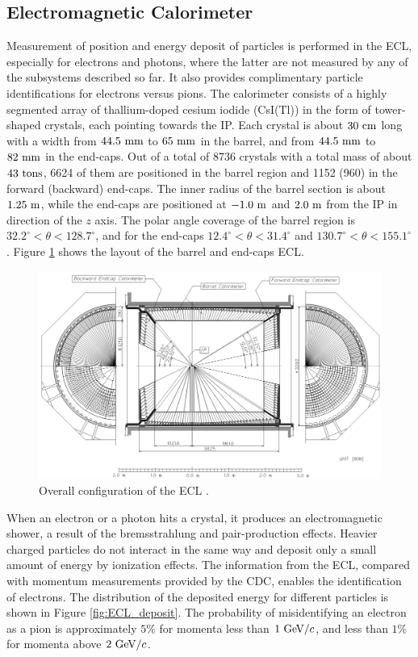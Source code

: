 \subsection{Electromagnetic Calorimeter}
Measurement of position and energy deposit of particles is performed in the ECL, especially for electrons and photons, where the latter are not measured by any of the subsystems described so far. It also provides complimentary particle identifications for electrons versus pions. The calorimeter consists of a highly segmented array of thallium-doped cesium iodide (CsI(Tl)) in the form of tower-shaped crystals, each pointing towards the IP. Each crystal is about $30\mathrm{~cm}$ long with a width from $44.5\mathrm{~mm}$ to $65\mathrm{~mm}$ in the barrel, and from $44.5\mathrm{~mm}$ to $82\mathrm{~mm}$ in the end-caps. Out of a total of 8736 crystals with a total mass of about $43\mathrm{~tons}$, 6624 of them are positioned in the barrel region and 1152 (960) in the forward (backward) end-caps. The inner radius of the barrel section is about $1.25\mathrm{~m}$, while the end-caps are positioned at $-1.0\mathrm{~m}$ and $2.0\mathrm{~m}$ from the IP in direction of the $z$ axis. The polar angle coverage of the barrel region is $32.2^\circ < \theta < 128.7^\circ$, and for the end-caps $12.4^\circ < \theta < 31.4^\circ$ and $130.7^\circ < \theta < 155.1^\circ$. Figure \ref{fig:ECL_layout} shows the layout of the barrel and end-caps ECL. 
\begin{figure}[H]
	\centering
	\captionsetup{width=0.8\linewidth}
	\includegraphics[width=\linewidth]{fig/setup/ECL_layout}
	\caption{Overall configuration of the ECL \cite{ABASHIAN2002117}.}
	\label{fig:ECL_layout}
\end{figure}
When an electron or a photon hits a crystal, it produces an electromagnetic shower, a result of the bremsstrahlung and pair-production effects. Heavier charged particles do not interact in the same way and deposit only a small amount of energy by ionization effects. The information from the ECL, compared with momentum measurements provided by the CDC, enables the identification of electrons. The distribution of the deposited energy for different particles is shown in Figure \ref{fig:ECL_deposit}. The probability of misidentifying an electron as a pion is approximately $5\%$ for momenta less than $1\mathrm{~GeV}/c$, and less than $1\%$ for momenta above $2\mathrm{~GeV}/c$.

